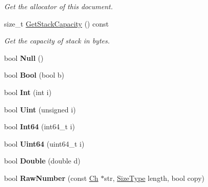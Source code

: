 \begin{DoxyCompactItemize}
\begin{DoxyCompactList}\small\item\em Get the allocator of this document. \end{DoxyCompactList}\item 
\mbox{\label{class_generic_document_a9e2e543c326b8b981d4f2c3d6793d15b}} 
size\+\_\+t \hyperlink{class_generic_document_a9e2e543c326b8b981d4f2c3d6793d15b}{Get\+Stack\+Capacity} () const
\begin{DoxyCompactList}\small\item\em Get the capacity of stack in bytes. \end{DoxyCompactList}\item 
\mbox{\label{class_generic_document_a87dc7f66b2b92660b8a43546733f9df2}} 
bool {\bfseries Null} ()
\item 
\mbox{\label{class_generic_document_a4c44780642518dd34bd241a1ea0ceaf1}} 
bool {\bfseries Bool} (bool b)
\item 
\mbox{\label{class_generic_document_a8cc986266becaa268474c607489745c7}} 
bool {\bfseries Int} (int i)
\item 
\mbox{\label{class_generic_document_a530dd899a04a00ba74f52507b488d2c1}} 
bool {\bfseries Uint} (unsigned i)
\item 
\mbox{\label{class_generic_document_a934b1b7a7ed89917615a5410db77a942}} 
bool {\bfseries Int64} (int64\+\_\+t i)
\item 
\mbox{\label{class_generic_document_a50ac3451a1afd0ce248dcc023d5e09e8}} 
bool {\bfseries Uint64} (uint64\+\_\+t i)
\item 
\mbox{\label{class_generic_document_a934bf7a5d1ff062ab079756d842e4f6b}} 
bool {\bfseries Double} (double d)
\item 
\mbox{\label{class_generic_document_af703994dec5af6ef049a24b5243aceab}} 
bool {\bfseries Raw\+Number} (const \hyperlink{class_generic_value_ade0e0ce64ccd5d852da57a35e720bafb}{Ch} $\ast$str, \hyperlink{rapidjson_8h_a5ed6e6e67250fadbd041127e6386dcb5}{Size\+Type} length, bool copy)

\end{DoxyCompactItemize}
